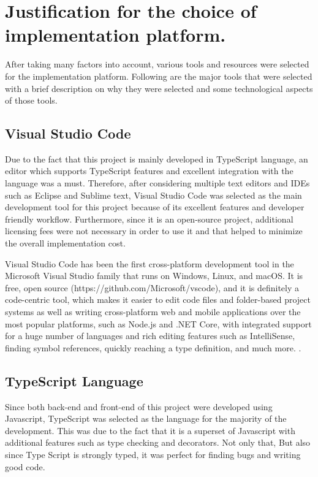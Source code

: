 \documentclass[12pt]{report}
\begin{document}
\section{Justification for the choice of implementation platform.}
After taking many factors into account, various tools and resources were selected for the implementation platform. Following are the major tools that were selected with a brief description on why they were selected and some technological aspects of those tools.

\subsection{Visual Studio Code}
Due to the fact that this project is mainly developed in TypeScript language, an editor which supports TypeScript features and excellent integration with the language was a must. Therefore, after considering multiple text editors and IDEs such as Eclipse and Sublime text, Visual Studio Code was selected as the main development tool for this project because of its excellent features and developer friendly workflow. Furthermore, since it is an open-source project, additional licensing fees were not necessary in order to use it and that helped to minimize the overall implementation cost.

Visual Studio Code has been the first cross-platform development tool in the Microsoft Visual Studio family that runs on Windows, Linux, and macOS. It is free, open source (https://github.com/Microsoft/vscode), and it is definitely a code-centric tool, which makes it easier to edit code files and folder-based project systems as well as writing cross-platform web and mobile applications over the most popular platforms, such as Node.js and .NET Core, with integrated support for a huge number of languages and rich editing features such as IntelliSense, finding symbol references, quickly reaching a type definition, and much more. \cite{alessandrodelsole_2019_visual}.

\subsection{TypeScript Language}
Since both back-end and front-end of this project were developed using Javascript, TypeScript was selected as the language for the majority of the development. This was due to the fact that it is a superset of Javascript with additional features such as type checking and decorators. Not only that, But also since Type Script is strongly typed, it was perfect for finding bugs and writing good code.
\end{document}
